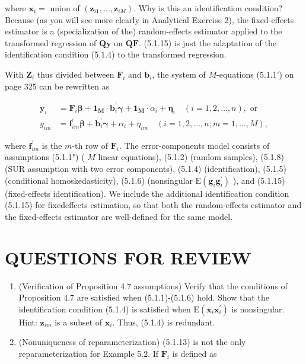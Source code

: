 \documentclass[10pt]{article}
\begin{document}
where $\mathbf{x}_{i}=$ union of $\left(\mathbf{z}_{i 1}, \ldots, \mathbf{z}_{i M}\right)$. Why is this an identification condition? Because (as you will see more clearly in Analytical Exercise 2), the fixed-effects estimator is a (specialization of the) random-effects estimator applied to the transformed regression of $\mathbf{Q y}$ on $\mathbf{Q F}$. (5.1.15) is just the adaptation of the identification condition (5.1.4) to the transformed regression.

With $\mathbf{Z}_{i}$ thus divided between $\mathbf{F}_{i}$ and $\mathbf{b}_{i}$, the system of $M$-equations (5.1.1') on page 325 can be rewritten as


\begin{align*}
\mathbf{y}_{i} & =\mathbf{F}_{i} \boldsymbol{\beta}+\mathbf{1}_{\boldsymbol{M}} \cdot \mathbf{b}_{i}^{\prime} \boldsymbol{\gamma}+\mathbf{1}_{\boldsymbol{M}} \cdot \alpha_{i}+\boldsymbol{\eta}_{i} \quad(i=1,2, \ldots, n), \text { or } \\
y_{i m} & =\mathbf{f}_{i m}^{\prime} \boldsymbol{\beta}+\mathbf{b}_{i}^{\prime} \boldsymbol{\gamma}+\alpha_{i}+\eta_{i m} \quad(i=1,2, \ldots, n ; m=1, \ldots, M), \tag{$\prime\prime$}
\end{align*}


where $\mathbf{f}_{i m}^{\prime}$ is the $m$-th row of $\mathbf{F}_{i}$. The error-components model consists of assumptions (5.1.1") ( $M$ linear equations), (5.1.2) (random samples), (5.1.8) (SUR assumption with two error components), (5.1.4) (identification), (5.1.5) (conditional homoskedasticity), (5.1.6) (nonsingular $\mathrm{E}\left(\mathbf{g}_{i} \mathbf{g}_{i}^{\prime}\right)$ ), and (5.1.15) (fixed-effects identification). We include the additional identification condition (5.1.15) for fixedeffects estimation, so that both the random-effects estimator and the fixed-effects estimator are well-defined for the same model.

\section*{QUESTIONS FOR REVIEW}
\begin{enumerate}
  \item (Verification of Proposition 4.7 assumptions) Verify that the conditions of Proposition 4.7 are satisfied when (5.1.1)-(5.1.6) hold. Show that the identification condition (5.1.4) is satisfied when $\mathrm{E}\left(\mathbf{x}_{i} \mathbf{x}_{i}^{\prime}\right)$ is nonsingular. Hint: $\mathbf{z}_{i m}$ is a subset of $\mathbf{x}_{i}$. Thus, (5.1.4) is redundant.
  \item (Nonuniqueness of reparameterization) (5.1.13) is not the only reparameterization for Example 5.2. If $\mathbf{F}_{i}$ is defined as
\end{enumerate}
\end{document}
